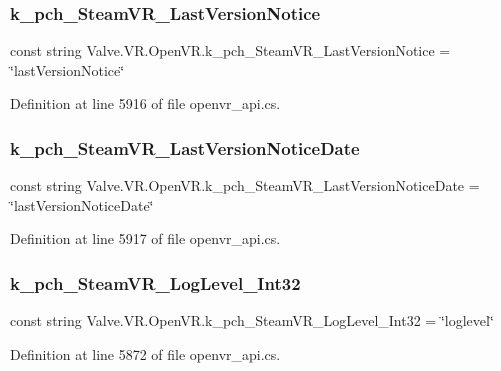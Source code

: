 \subsubsection{\texorpdfstring{k\_pch\_SteamVR\_LastVersionNotice}{k\_pch\_SteamVR\_LastVersionNotice}}
{\footnotesize\ttfamily const string Valve.\+V\+R.\+Open\+V\+R.\+k\+\_\+pch\+\_\+\+Steam\+V\+R\+\_\+\+Last\+Version\+Notice = \char`\"{}last\+Version\+Notice\char`\"{}}



Definition at line 5916 of file openvr\+\_\+api.\+cs.

\mbox{\label{class_valve_1_1_v_r_1_1_open_v_r_a6b9ad4d7b7c5c5ce6e80d1715471466e}} 
\subsubsection{\texorpdfstring{k\_pch\_SteamVR\_LastVersionNoticeDate}{k\_pch\_SteamVR\_LastVersionNoticeDate}}
{\footnotesize\ttfamily const string Valve.\+V\+R.\+Open\+V\+R.\+k\+\_\+pch\+\_\+\+Steam\+V\+R\+\_\+\+Last\+Version\+Notice\+Date = \char`\"{}last\+Version\+Notice\+Date\char`\"{}}



Definition at line 5917 of file openvr\+\_\+api.\+cs.

\mbox{\label{class_valve_1_1_v_r_1_1_open_v_r_a29d293e836c6c27bf7ee4564525d8a01}} 
\subsubsection{\texorpdfstring{k\_pch\_SteamVR\_LogLevel\_Int32}{k\_pch\_SteamVR\_LogLevel\_Int32}}
{\footnotesize\ttfamily const string Valve.\+V\+R.\+Open\+V\+R.\+k\+\_\+pch\+\_\+\+Steam\+V\+R\+\_\+\+Log\+Level\+\_\+\+Int32 = \char`\"{}loglevel\char`\"{}}



Definition at line 5872 of file openvr\+\_\+api.\+cs.

